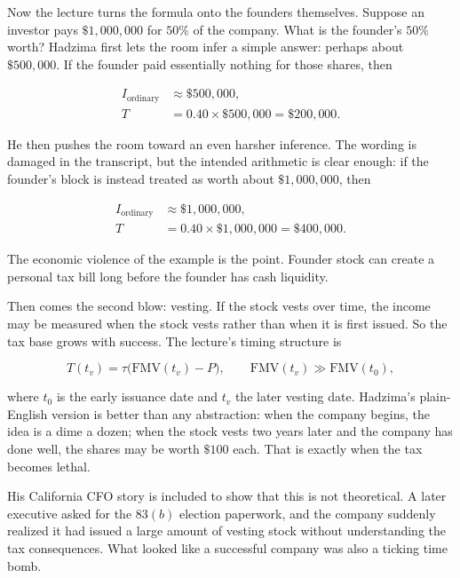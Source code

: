 Now the lecture turns the formula onto the founders themselves. Suppose an investor pays \(\$1{,}000{,}000\) for \(50\%\) of the company. What is the founder's \(50\%\) worth? Hadzima first lets the room infer a simple answer: perhaps about \(\$500{,}000\). If the founder paid essentially nothing for those shares, then

\begin{align}
I_{\text{ordinary}} &\approx \$500{,}000,\\
T &= 0.40\times \$500{,}000=\$200{,}000.
\end{align}

He then pushes the room toward an even harsher inference. The wording is damaged in the transcript, but the intended arithmetic is clear enough: if the founder's block is instead treated as worth about \(\$1{,}000{,}000\), then

\begin{align}
I_{\text{ordinary}} &\approx \$1{,}000{,}000,\\
T &= 0.40\times \$1{,}000{,}000=\$400{,}000.
\end{align}

The economic violence of the example is the point. Founder stock can create a personal tax bill long before the founder has cash liquidity.

Then comes the second blow: vesting. If the stock vests over time, the income may be measured when the stock vests rather than when it is first issued. So the tax base grows with success. The lecture's timing structure is

\begin{equation}
T(t_v)=\tau\bigl(\mathrm{FMV}(t_v)-P\bigr),
\qquad
\mathrm{FMV}(t_v)\gg \mathrm{FMV}(t_0),
\end{equation}

where \(t_0\) is the early issuance date and \(t_v\) the later vesting date. Hadzima's plain-English version is better than any abstraction: when the company begins, the idea is a dime a dozen; when the stock vests two years later and the company has done well, the shares may be worth \(\$100\) each. That is exactly when the tax becomes lethal.

His California CFO story is included to show that this is not theoretical. A later executive asked for the \(83(b)\) election paperwork, and the company suddenly realized it had issued a large amount of vesting stock without understanding the tax consequences. What looked like a successful company was also a ticking time bomb.


